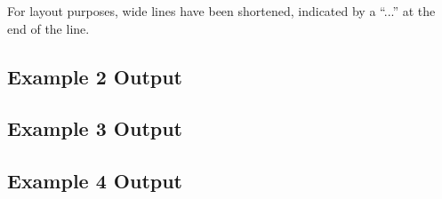 
For layout purposes, wide lines have been shortened, indicated by a ``...'' at the
end of the line.

\subsection{Example 2 Output}
\label{example2-output}

{\small
 
}

\newpage
\subsection{Example 3 Output}
\label{example3-output}
{\small
 

}

\newpage
\subsection{Example 4 Output}
\label{example4-output}
{\small
 

}

